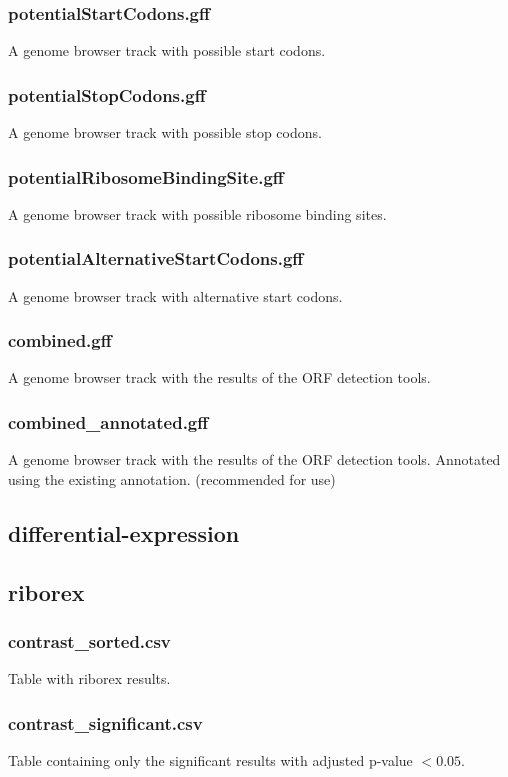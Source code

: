 \documentclass[10pt,a4paper]{article}
\begin{document}
\subsubsection*{potentialStartCodons.gff}
A genome browser track with possible start codons.
\subsubsection*{potentialStopCodons.gff}
A genome browser track with possible stop codons.
\subsubsection*{potentialRibosomeBindingSite.gff}
A genome browser track with possible ribosome binding sites.
\subsubsection*{potentialAlternativeStartCodons.gff}
A genome browser track with alternative start codons.
\subsubsection*{combined.gff}
A genome browser track with the results of the ORF detection tools.
\subsubsection*{combined\_annotated.gff}
A genome browser track with the results of the ORF detection tools. Annotated using the existing annotation. (recommended for use)

\subsection*{differential-expression}
\subsection*{riborex}
\subsubsection*{contrast\_sorted.csv} 
Table with riborex results.
\subsubsection*{contrast\_significant.csv}
Table containing only the significant results with adjusted p-value $< 0.05$.
\end{document}
